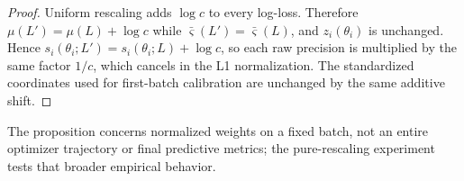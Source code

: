 \begin{proof}
Uniform rescaling adds $\log c$ to every log-loss. Therefore $\mu(L')=\mu(L)+\log c$ while
$\bar{\varsigma}(L')=\bar{\varsigma}(L)$, and $z_i(\theta_i)$ is unchanged. Hence
$s_i(\theta_i;L')=s_i(\theta_i;L)+\log c$, so each raw precision is multiplied by the same
factor $1/c$, which cancels in the L1 normalization. The standardized coordinates used for
first-batch calibration are unchanged by the same additive shift.
\end{proof}

The proposition concerns normalized weights on a fixed batch, not an entire optimizer trajectory or
final predictive metrics; the pure-rescaling experiment tests that broader empirical behavior.
